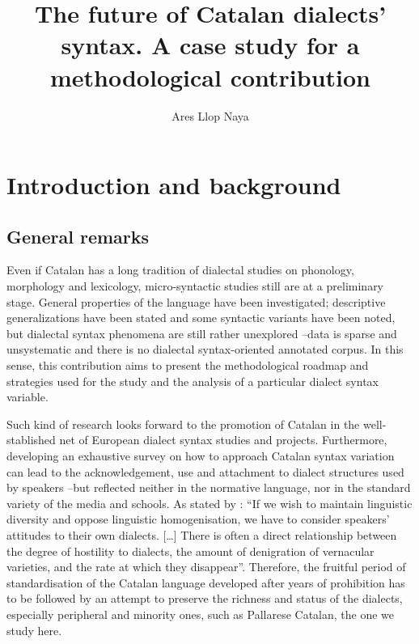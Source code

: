 \documentclass[output=paper]{LSP/langsci}
\title{The future of Catalan dialects’ syntax. A case study for a methodological contribution}
\author{Ares Llop Naya\affiliation{Universitat Autònoma de Barcelona}}
\begin{document}
 

\section{Introduction and background}

\subsection{ General remarks}
Even if Catalan has a long tradition of dialectal studies on phonology, morphology and lexicology, micro-syntactic studies still are at a preliminary stage. General properties of the language have been investigated; descriptive generalizations have been stated and some syntactic variants have been noted, but dialectal syntax phenomena are still rather unexplored –data is sparse and unsystematic and there is no dialectal syntax-oriented annotated corpus. In this sense, this contribution aims to present the methodological roadmap and strategies used for the study and the analysis of a particular dialect syntax variable.

Such kind of research looks forward to the promotion of Catalan in the well-stablished net of European dialect syntax studies and projects. Furthermore, developing an exhaustive survey on how to approach Catalan syntax variation can lead to the acknowledgement, use and attachment to dialect structures used by speakers –but reflected neither in the normative language, nor in the standard variety of the media and schools. As stated by \citet[30]{trudgill_sociolinguistic_2002}: “If we wish to maintain linguistic diversity and oppose linguistic homogenisation, we have to consider speakers’ attitudes to their own dialects. […] There is often a direct relationship between the degree of hostility to dialects, the amount of denigration of vernacular varieties, and the rate at which they disappear”. Therefore, the fruitful period of standardisation of the Catalan language developed after years of prohibition has to be followed by an attempt to preserve the richness and status of the dialects, especially peripheral and minority ones, such as Pallarese Catalan, the one we study here.
\end{document}
